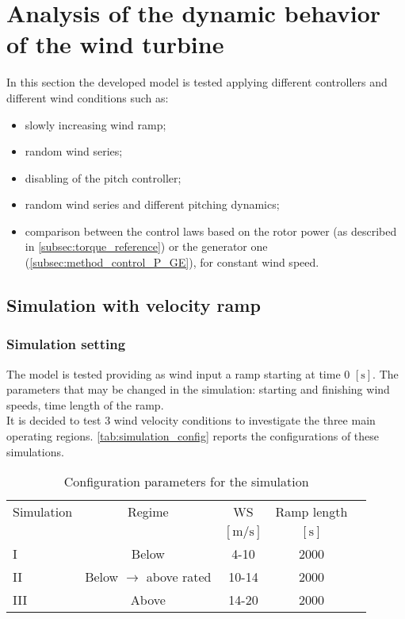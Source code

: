 \newpage
\section{Analysis of the dynamic behavior of the wind turbine}\label{sec:c_basic_model_simulation}
In this section the developed model is tested applying different controllers and different wind conditions such as:
\begin{itemize}
  \item slowly increasing wind ramp;
  \item random wind series;
  \item disabling of the pitch controller;
  \item random wind series and different pitching dynamics;
  \item comparison between the control laws based on the rotor power (as described in \autoref{subsec:torque_reference}) or the generator one (\autoref{subsec:method_control_P_GE}), for constant wind speed.
\end{itemize}
\subsection{Simulation with velocity ramp}
\subsubsection{Simulation setting}
The model is tested providing as wind input a ramp starting at time 0 $\left[\si{\second}\right]$. The parameters that may be changed in the simulation: starting and finishing wind speeds, time length of the ramp.\\
It is decided to test 3 wind velocity conditions to investigate the three main operating regions. \autoref{tab:simulation_config} reports the configurations of these simulations. 
\begin{table}[htb]
    \caption{Configuration parameters for the simulation}
    \centering
    \begin{tabular}{lcccc}
    \toprule
      Simulation & Regime  & WS & Ramp length \\ 
       & & $\left[\si{\meter\per\second}\right]$ & $\left[\si{\second}\right]$ \\ \midrule       
       I & Below & 4-10 & 2000  \\
       II & Below $\rightarrow$ above rated & 10-14 & 2000 \\
       III & Above & 14-20 & 2000  \\
       \bottomrule
    \end{tabular}
    \label{tab:simulation_config}
\end{table}

